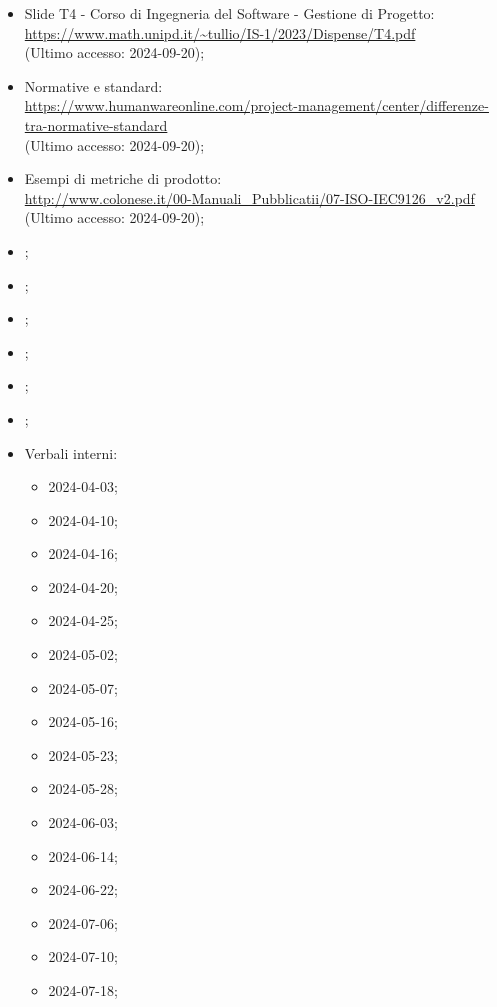\begin{itemize}
  \item Slide T4 - Corso di Ingegneria del Software - Gestione di Progetto: \\ \href{https://www.math.unipd.it/~tullio/IS-1/2023/Dispense/T4.pdf}{https://www.math.unipd.it/\textasciitilde tullio/IS-1/2023/Dispense/T4.pdf}  \\ (Ultimo accesso: 2024-09-20);
  \item Normative e standard: \\ \href{https://www.humanwareonline.com/project-management/center/differenze-tra-normative-standard}{https://www.humanwareonline.com/project-management/center/differenze-tra-normative-standard}  \\ (Ultimo accesso: 2024-09-20);
  \item Esempi di metriche di prodotto: \\ \href{http://www.colonese.it/00-Manuali_Pubblicatii/07-ISO-IEC9126_v2.pdf}{http://www.colonese.it/00-Manuali\_Pubblicatii/07-ISO-IEC9126\_v2.pdf} \\ (Ultimo accesso: 2024-09-20);
  \item \PianoDiProgetto;
  \item \PianoDiQualifica;
  \item \AnalisiDeiRequisiti;
  \item \Glossario;
  \item \SpecificaTecnica;
  \item \ManualeUtente;
  \item Verbali interni:
  \begin{itemize}
    \item 2024-04-03;
    \item 2024-04-10;
    \item 2024-04-16;
    \item 2024-04-20;
    \item 2024-04-25;
    \item 2024-05-02;
    \item 2024-05-07;
    \item 2024-05-16;
    \item 2024-05-23;
    \item 2024-05-28;
    \item 2024-06-03;
    \item 2024-06-14;
    \item 2024-06-22;
    \item 2024-07-06;
    \item 2024-07-10;
    \item 2024-07-18;

\end{itemize}
\end{itemize}
